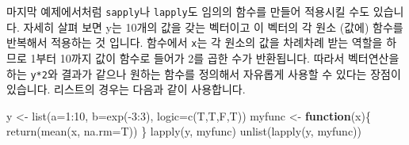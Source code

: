 \documentclass[
]{book}
\newenvironment{Shaded}{\begin{snugshade}}{\end{snugshade}}
\newcommand{\AttributeTok}[1]{\textcolor[rgb]{0.77,0.63,0.00}{#1}}
\newcommand{\ControlFlowTok}[1]{\textcolor[rgb]{0.13,0.29,0.53}{\textbf{#1}}}
\newcommand{\DecValTok}[1]{\textcolor[rgb]{0.00,0.00,0.81}{#1}}
\newcommand{\FunctionTok}[1]{\textcolor[rgb]{0.00,0.00,0.00}{#1}}
\newcommand{\NormalTok}[1]{#1}
\newcommand{\OtherTok}[1]{\textcolor[rgb]{0.56,0.35,0.01}{#1}}
\newcommand{\SpecialCharTok}[1]{\textcolor[rgb]{0.00,0.00,0.00}{#1}}
\begin{document}
\begin{Shaded}
\end{Shaded}

마지막 예제에서처럼 \texttt{sapply}나 \texttt{lapply}도 임의의 함수를 만들어 적용시킬 수도 있습니다. 자세히 살펴 보면 y는 10개의 값을 갖는 벡터이고 이 벡터의 각 원소 (값에) 함수를 반복해서 적용하는 것 입니다. 함수에서 \texttt{x}는 각 원소의 값을 차례차례 받는 역할을 하므로 1부터 10까지 값이 함수로 들어가 2를 곱한 수가 반환됩니다. 따라서 벡터연산을 하는 \texttt{y*2}와 결과가 같으나 원하는 함수를 정의해서 자유롭게 사용할 수 있다는 장점이 있습니다. 리스트의 경우는 다음과 같이 사용합니다.

\begin{Shaded}
\begin{Highlighting}[]
\NormalTok{y }\OtherTok{\textless{}{-}} \FunctionTok{list}\NormalTok{(}\AttributeTok{a=}\DecValTok{1}\SpecialCharTok{:}\DecValTok{10}\NormalTok{, }\AttributeTok{b=}\FunctionTok{exp}\NormalTok{(}\SpecialCharTok{{-}}\DecValTok{3}\SpecialCharTok{:}\DecValTok{3}\NormalTok{), }\AttributeTok{logic=}\FunctionTok{c}\NormalTok{(T,T,F,T))}
\NormalTok{myfunc }\OtherTok{\textless{}{-}} \ControlFlowTok{function}\NormalTok{(x)\{}
  \FunctionTok{return}\NormalTok{(}\FunctionTok{mean}\NormalTok{(x, }\AttributeTok{na.rm=}\NormalTok{T))}
\NormalTok{\}}
\FunctionTok{lapply}\NormalTok{(y, myfunc)}
\FunctionTok{unlist}\NormalTok{(}\FunctionTok{lapply}\NormalTok{(y, myfunc))}
\end{Highlighting}
\end{Shaded}
\end{document}
